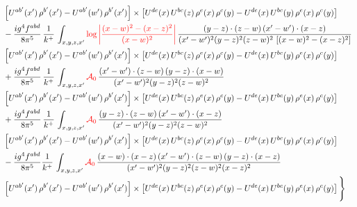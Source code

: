 \documentclass[9pt]{article}
\numberwithin{equation}{section}
\begin{document}
\begin{align}
& \left[U^{ab'}(x')\,\rho^{b'}(x')-U^{ab'}(w')\, \rho^{b'}(x')\right]\times \left[U^{de}(x)\,U^{bc}(z)\, \rho^{e}(x)\,\rho^{c}(y)-U^{de}(x)\,U^{bc}(y)\,\rho^{e}(x)\,\rho^{c}(y)\right] \notag \\
& -\frac{ig^{4}f^{abd}}{8\pi^{5}}\,\frac{1}{k^{+}}\,\int_{x,y,z,x'}{\color{red}\log{\left|\frac{(x-w)^{2}-(x-z)^{2}}{(x-w)^{2}}\right|}}\,
\frac{(y-z)\cdot(z-w)\,(x'-w')\cdot(x-z)}{(x'-w')^{2}(y-z)^{2}(z-w)^{2}\,\left[(x-w)^{2}-(x-z)^{2}\right]}\notag \\ & \left[U^{ab'}(x')\,\rho^{b'}(x')-U^{ab'}(w')\, \rho^{b'}(x')\right]\times \left[U^{de}(x)\,U^{bc}(z)\, \rho^{e}(x)\,\rho^{c}(y)-U^{de}(x)\,U^{bc}(y)\,\rho^{e}(x)\,\rho^{c}(y)\right] \notag \\
& +\frac{ig^{4}f^{abd}}{8\pi^{5}}\,\frac{1}{k^{+}}\,\int_{x,y,z,x'}{\color{red}\mathcal{A}_{0}}\,
\frac{(x'-w')\cdot(z-w)\,(y-z)\cdot(x-w)}{(x'-w')^{2}(y-z)^{2}(z-w)^{2}}\notag \\
& \left[U^{ab'}(x')\,\rho^{b'}(x')-U^{ab'}(w')\, \rho^{b'}(x')\right]\times \left[U^{de}(x)\,U^{bc}(z)\, \rho^{e}(x)\,\rho^{c}(y)-U^{de}(x)\,U^{bc}(y)\,\rho^{e}(x)\,\rho^{c}(y)\right] \notag \\
& +\frac{ig^{4}f^{abd}}{8\pi^{5}}\,\frac{1}{k^{+}}\,\int_{x,y,z,x'}{\color{red}\mathcal{A}_{0}}\,
\frac{(y-z)\cdot(z-w)\,(x'-w')\cdot(x-z)}{(x'-w')^{2}(y-z)^{2}(z-w)^{2}}\notag \\ & \left[U^{ab'}(x')\,\rho^{b'}(x')-U^{ab'}(w')\, \rho^{b'}(x')\right]\times \left[U^{de}(x)\,U^{bc}(z)\, \rho^{e}(x)\,\rho^{c}(y)-U^{de}(x)\,U^{bc}(y)\,\rho^{e}(x)\,\rho^{c}(y)\right] \notag \\
& -\frac{ig^{4}f^{abd}}{8\pi^{5}}\frac{1}{k^{+}}\,\int_{x,y,z,x'}{\color{red}\mathcal{A}_{0}}\,
\frac{(x-w)\cdot(x-z)\,(x'-w')\cdot(z-w)\,(y-z)\cdot(x-z)}{(x'-w')^{2}(y-z)^{2}(z-w)^{2}(x-z)^{2}}\notag \\ & \left[U^{ab'}(x')\,\rho^{b'}(x')-U^{ab'}(w')\, \rho^{b'}(x')\right]\times \left[U^{de}(x)\,U^{bc}(z)\, \rho^{e}(x)\,\rho^{c}(y)-U^{de}(x)\,U^{bc}(y)\,\rho^{e}(x)\,\rho^{c}(y)\right]\Bigg\}
\end{align}
\end{document}
